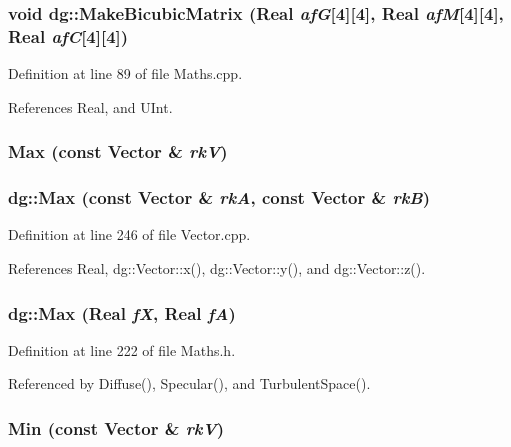 \subsubsection{\setlength{\rightskip}{0pt plus 5cm}void dg::Make\-Bicubic\-Matrix ({\bf Real} {\em af\-G}[4][4], {\bf Real} {\em af\-M}[4][4], {\bf Real} {\em af\-C}[4][4])}\label{namespacedg_a120}




Definition at line 89 of file Maths.cpp.

References Real, and UInt.
\subsubsection{ Max (const {\bf Vector} \& {\em rk\-V})}\label{namespacedg_a188}


\subsubsection{ dg::Max (const {\bf Vector} \& {\em rk\-A}, const {\bf Vector} \& {\em rk\-B})}\label{namespacedg_a185}




Definition at line 246 of file Vector.cpp.

References Real, dg::Vector::x(), dg::Vector::y(), and dg::Vector::z().
\subsubsection{ dg::Max ({\bf Real} {\em f\-X}, {\bf Real} {\em f\-A})\hspace{0.3cm}{\tt  [inline]}}\label{namespacedg_a106}




Definition at line 222 of file Maths.h.

Referenced by Diffuse(), Specular(), and Turbulent\-Space().
\subsubsection{ Min (const {\bf Vector} \& {\em rk\-V})}\label{namespacedg_a187}


